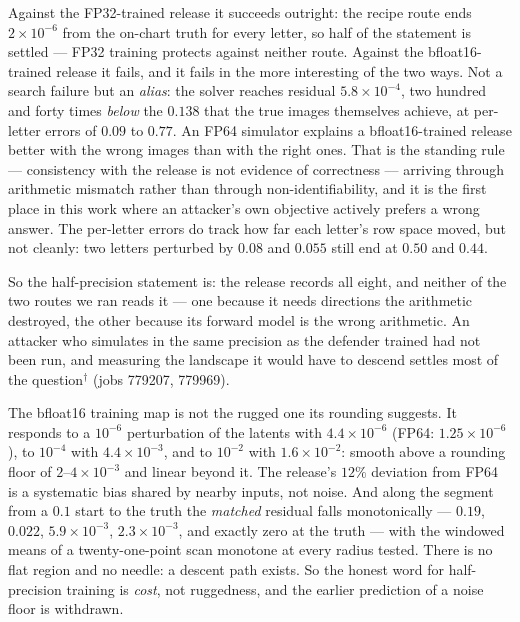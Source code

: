 Against the FP32-trained release it succeeds outright: the recipe route ends
$2\times10^{-6}$ from the on-chart truth for every letter, so half of the
statement is settled --- FP32 training protects against neither route.
Against the bfloat16-trained release it fails, and it fails in the more
interesting of the two ways. Not a search failure but an \emph{alias}: the
solver reaches residual $5.8\times10^{-4}$, two hundred and forty times
\emph{below} the $0.138$ that the true images themselves achieve, at per-letter
errors of $0.09$ to $0.77$. An FP64 simulator explains a bfloat16-trained
release better with the wrong images than with the right ones. That is the
standing rule --- consistency with the release is not evidence of correctness
--- arriving through arithmetic mismatch rather than through
non-identifiability, and it is the first place in this work where an
attacker's own objective actively prefers a wrong answer. The per-letter
errors do track how far each letter's row space moved, but not cleanly: two
letters perturbed by $0.08$ and $0.055$ still end at $0.50$ and $0.44$.

So the half-precision statement is: the release records all eight, and neither
of the two routes we ran reads it --- one because it needs directions the
arithmetic destroyed, the other because its forward model is the wrong
arithmetic. An attacker who simulates in the same precision as the defender
trained had not been run, and measuring the landscape it would have to descend
settles most of the question$^\dagger$ (jobs 779207, 779969).

The bfloat16 training map is not the rugged one its rounding suggests. It
responds to a $10^{-6}$ perturbation of the latents with $4.4\times10^{-6}$
(FP64: $1.25\times10^{-6}$), to $10^{-4}$ with $4.4\times10^{-3}$, and to
$10^{-2}$ with $1.6\times10^{-2}$: smooth above a rounding floor of $2$--$4
\times10^{-3}$ and linear beyond it. The release's $12\%$ deviation from FP64
is a systematic bias shared by nearby inputs, not noise. And along the segment
from a $0.1$ start to the truth the \emph{matched} residual falls
monotonically --- $0.19$, $0.022$, $5.9\times10^{-3}$,
$2.3\times10^{-3}$, and exactly zero at the truth --- with the windowed means
of a twenty-one-point scan monotone at every radius tested. There is no flat
region and no needle: a descent path exists. So the honest word for
half-precision training is \emph{cost}, not ruggedness, and the earlier
prediction of a noise floor is withdrawn.

